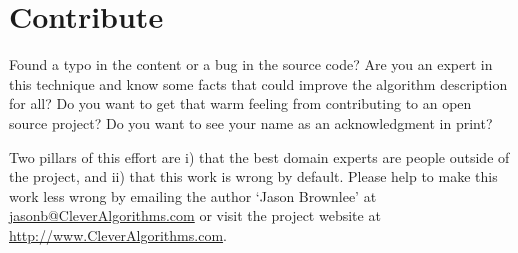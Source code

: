 \documentclass[a4paper, 11pt]{article}
\makeatletter
\newcommand{\myreportauthor}{Jason Brownlee}
\newcommand{\myreportemail}{jasonb@CleverAlgorithms.com}
\newcommand{\myreportwebsite}{http://www.CleverAlgorithms.com}
\makeatother
\begin{document}
% 
% 
\section{Contribute}
\label{sec:contribute}
Found a typo in the content or a bug in the source code? 
Are you an expert in this technique and know some facts that could improve the algorithm description for all?
Do you want to get that warm feeling from contributing to an open source project? 
Do you want to see your name as an acknowledgment in print?

Two pillars of this effort are i) that the best domain experts are people outside of the project, and ii) that this work is wrong by default. 
Please help to make this work less wrong by emailing the author `\myreportauthor' at \url{\myreportemail} or visit the project website at \url{\myreportwebsite}.



\end{document}

